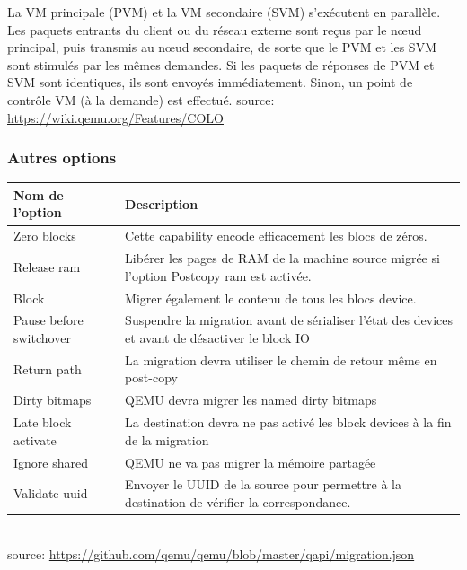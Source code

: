 La VM principale (PVM) et la VM secondaire (SVM) s'exécutent en parallèle.
Les paquets entrants du client ou du réseau externe sont reçus par le
nœud principal, puis transmis au nœud secondaire, de sorte que le PVM
et les SVM sont stimulés par les mêmes demandes.
Si les paquets de réponses de PVM et SVM sont identiques, ils sont envoyés immédiatement. Sinon, un point de contrôle VM (à la demande) est effectué.
source: \url{https://wiki.qemu.org/Features/COLO}


\subsubsection*{Autres options}
\begin{tabular}{ |p{3cm}|p{10cm}|  }
    \hline
    Nom de l'option& Description\\
    \hline
    \hline
    Zero blocks&Cette capability encode efficacement les blocs de zéros.\\
    \hline
    Release ram& Libérer les pages de RAM de la machine source migrée si l'option Postcopy ram est activée.\\
    \hline
    Block& Migrer également le contenu de tous les blocs device.\\
    \hline
    Pause before switchover& Suspendre la migration avant de sérialiser l'état des devices et avant de désactiver le block IO \\
    \hline
    Return path& La migration devra utiliser le chemin de retour même en post-copy\\
    \hline
    Dirty bitmaps& QEMU devra migrer les named dirty bitmaps\\
    \hline
    Late block activate& La destination devra ne pas activé les block devices à la fin de la migration\\
    \hline
    Ignore shared& QEMU ne va pas migrer la mémoire partagée \\
    \hline
    Validate uuid& Envoyer le UUID de la source pour permettre à la destination de vérifier la correspondance.\\
    \hline
   \end{tabular}
\\

source:  \url{https://github.com/qemu/qemu/blob/master/qapi/migration.json}

